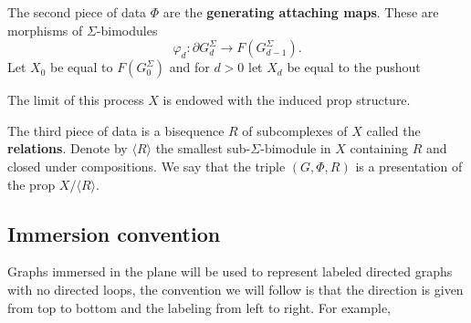 \documentclass{amsart}
\renewcommand{\1}{\mathbf{1}}
\theoremstyle{definition}
\begin{document}
The second piece of data $\Phi$ are the \textbf{generating attaching maps}. These are morphisms of $\Sigma$-bimodules
\begin{equation*}
\varphi_d: \partial G_d^\Sigma \to F(G^\Sigma_{d-1}).
\end{equation*}
Let $X_0$ be equal to $F(G^\Sigma_0)$ and for $d > 0$ let $X_d$ be equal to the pushout
\begin{center}
\end{center}
The limit of this process $X$ is endowed with the induced prop structure.

The third piece of data is a bisequence $R$ of subcomplexes of $X$ called the \textbf{relations}. Denote by $\langle R \rangle$ the smallest sub-$\Sigma$-bimodule in $X$ containing $R$ and closed under compositions. We say that the triple $(G,\Phi,R)$ is a presentation of the prop $X/\langle R\rangle$.

\subsection{Immersion convention} Graphs immersed in the plane will be used to represent labeled directed graphs with no directed loops, the convention we will follow is that the direction is given from top to bottom and the labeling from left to right. For example,
\end{document}

